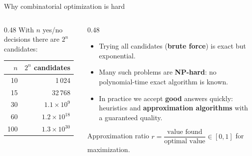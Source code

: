 \documentclass[aspectratio=169,11pt]{beamer}
\newcommand{\key}[1]{{\color{qdark}\textbf{#1}}}
\begin{document}
\begin{frame}{Why combinatorial optimization is hard}
  \begin{columns}[c]
    \begin{column}{0.48\textwidth}
      With $n$ yes/no decisions there are $2^n$ candidates:
      \begin{center}\small
      \begin{tabular}{rr}
        \toprule $n$ & $2^n$ candidates\\ \midrule
        10 & 1\,024\\ 15 & 32\,768\\ 30 & $1.1\times10^{9}$\\ 60 & $1.2\times10^{18}$\\ 100 & $1.3\times10^{30}$\\ \bottomrule
      \end{tabular}
      \end{center}
    \end{column}
    \begin{column}{0.48\textwidth}
      \begin{itemize}
        \item Trying all candidates (\key{brute force}) is exact but exponential.
        \item Many such problems are \key{NP-hard}: no polynomial-time exact algorithm is known.
        \item In practice we accept \key{good} answers quickly: heuristics and \key{approximation algorithms} with a
          guaranteed quality.
      \end{itemize}
      \begin{block}{Approximation ratio}
        $r = \dfrac{\text{value found}}{\text{optimal value}} \in [0, 1]$ for maximization.
      \end{block}
    \end{column}
  \end{columns}
\end{frame}
\end{document}
